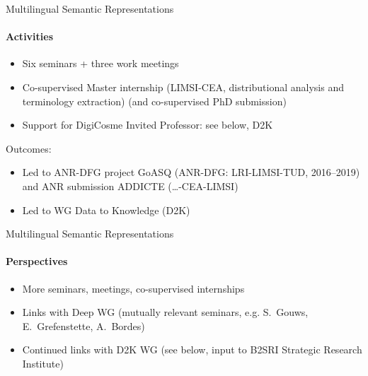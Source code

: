 \begin{frame}{Multilingual Semantic Representations}
  \framesubtitle{Activities}
  \begin{itemize}
  \item Six seminars + three work meetings
  \item Co-supervised Master internship (LIMSI-CEA, distributional analysis and terminology extraction)
    (and co-supervised PhD submission)
  \item Support for DigiCosme Invited Professor: see below, D2K
  \end{itemize}

  Outcomes:
  \begin{itemize}
  \item Led to ANR-DFG project GoASQ (ANR-DFG: LRI-LIMSI-TUD, 2016--2019) and ANR submission ADDICTE (\ldots-CEA-LIMSI)
  \item Led to WG Data to Knowledge (D2K)
\end{itemize}

\end{frame}

\begin{frame}{Multilingual Semantic Representations}
\framesubtitle{Perspectives}
\begin{itemize}
\item More seminars, meetings, co-supervised internships
\item Links with Deep WG (mutually relevant seminars, e.g. S.~Gouws, E.~Grefenstette, A.~Bordes)
\item Continued links with D2K WG (see below, input to B2SRI Strategic Research Institute)
\end{itemize}

\end{frame}


